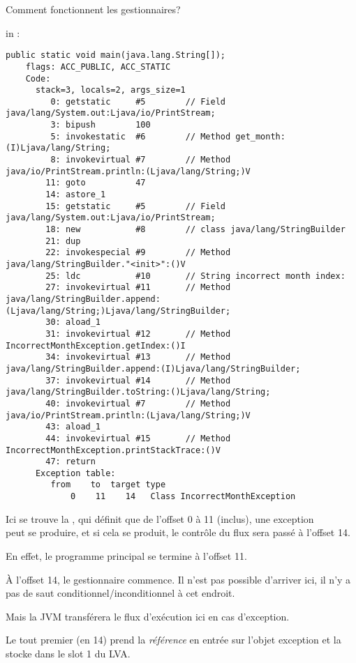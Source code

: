 Comment fonctionnent les gestionnaires?

\main in :

\begin{lstlisting}[caption=Month2.class]
  public static void main(java.lang.String[]);
    flags: ACC_PUBLIC, ACC_STATIC
    Code:
      stack=3, locals=2, args_size=1
         0: getstatic     #5        // Field java/lang/System.out:Ljava/io/PrintStream;
         3: bipush        100
         5: invokestatic  #6        // Method get_month:(I)Ljava/lang/String;
         8: invokevirtual #7        // Method java/io/PrintStream.println:(Ljava/lang/String;)V
        11: goto          47
        14: astore_1
        15: getstatic     #5        // Field java/lang/System.out:Ljava/io/PrintStream;
        18: new           #8        // class java/lang/StringBuilder
        21: dup
        22: invokespecial #9        // Method java/lang/StringBuilder."<init>":()V
        25: ldc           #10       // String incorrect month index:
        27: invokevirtual #11       // Method java/lang/StringBuilder.append:(Ljava/lang/String;)Ljava/lang/StringBuilder;
        30: aload_1
        31: invokevirtual #12       // Method IncorrectMonthException.getIndex:()I
        34: invokevirtual #13       // Method java/lang/StringBuilder.append:(I)Ljava/lang/StringBuilder;
        37: invokevirtual #14       // Method java/lang/StringBuilder.toString:()Ljava/lang/String;
        40: invokevirtual #7        // Method java/io/PrintStream.println:(Ljava/lang/String;)V
        43: aload_1
        44: invokevirtual #15       // Method IncorrectMonthException.printStackTrace:()V
        47: return
      Exception table:
         from    to  target type
             0    11    14   Class IncorrectMonthException
\end{lstlisting}

Ici se trouve la , qui définit que de l'offset 0 à 11 (inclus), une exception \\
 peut se produire, et si cela se produit, le contrôle
du flux sera passé à l'offset 14.

En effet, le programme principal se termine à l'offset 11.

À l'offset 14, le gestionnaire commence. Il n'est pas possible d'arriver ici,
il n'y a pas de saut conditionnel/inconditionnel à cet endroit.

Mais la \ac{JVM} transférera le flux d'exécution ici en cas d'exception.

Le tout premier  (en 14) prend la \emph{référence} en entrée  sur l'objet
exception et la stocke dans le slot 1 du \ac{LVA}.


